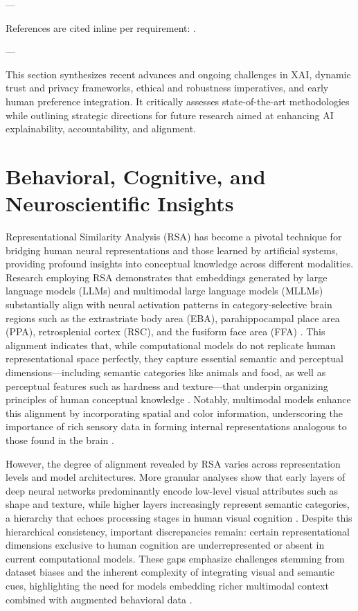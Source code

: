 \documentclass[11pt]{article}
\begin{document}
---

References are cited inline per requirement: \cite{ref8,ref11,ref12,ref13,ref16,ref17,ref24,ref25,ref34,ref35,ref41}.

---

This section synthesizes recent advances and ongoing challenges in XAI, dynamic trust and privacy frameworks, ethical and robustness imperatives, and early human preference integration. It critically assesses state-of-the-art methodologies while outlining strategic directions for future research aimed at enhancing AI explainability, accountability, and alignment.

\section{Behavioral, Cognitive, and Neuroscientific Insights}

Representational Similarity Analysis (RSA) has become a pivotal technique for bridging human neural representations and those learned by artificial systems, providing profound insights into conceptual knowledge across different modalities. Research employing RSA demonstrates that embeddings generated by large language models (LLMs) and multimodal large language models (MLLMs) substantially align with neural activation patterns in category-selective brain regions such as the extrastriate body area (EBA), parahippocampal place area (PPA), retrosplenial cortex (RSC), and the fusiform face area (FFA) \cite{ref1,ref2}. This alignment indicates that, while computational models do not replicate human representational space perfectly, they capture essential semantic and perceptual dimensions—including semantic categories like animals and food, as well as perceptual features such as hardness and texture—that underpin organizing principles of human conceptual knowledge \cite{ref1}. Notably, multimodal models enhance this alignment by incorporating spatial and color information, underscoring the importance of rich sensory data in forming internal representations analogous to those found in the brain \cite{ref2}.

However, the degree of alignment revealed by RSA varies across representation levels and model architectures. More granular analyses show that early layers of deep neural networks predominantly encode low-level visual attributes such as shape and texture, while higher layers increasingly represent semantic categories, a hierarchy that echoes processing stages in human visual cognition \cite{ref2}. Despite this hierarchical consistency, important discrepancies remain: certain representational dimensions exclusive to human cognition are underrepresented or absent in current computational models. These gaps emphasize challenges stemming from dataset biases and the inherent complexity of integrating visual and semantic cues, highlighting the need for models embedding richer multimodal context combined with augmented behavioral data \cite{ref2,ref4,ref5}.
\end{document}
